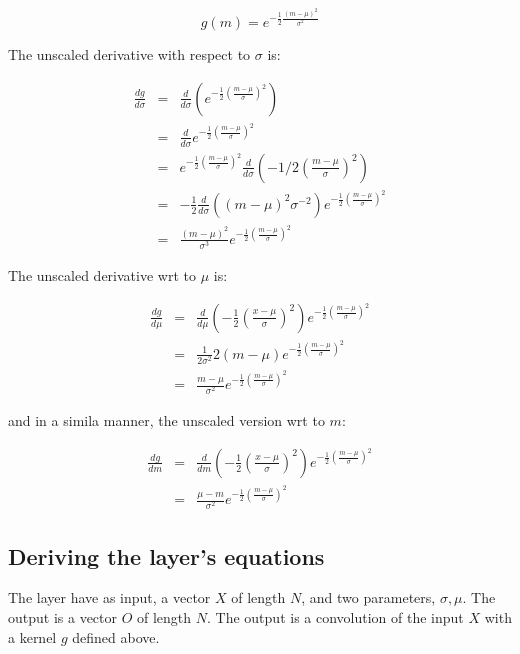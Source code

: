 \documentclass{article}
\begin{document}
\begin{equation}
	g(m) = e^{-\frac{1}{2} \frac{(m - \mu)^2}{\sigma^2}}
\end{equation}


The unscaled derivative with respect to $\sigma$ is:

\begin{eqnarray}
	\frac{d g}{d \sigma}&=&\frac{d}{d \sigma}\left(e^{-\frac{1}{2} \left(\frac{m - \mu}{\sigma}\right)^2} \right) \\
	&=&\frac{d}{d \sigma} e^{-\frac{1}{2} \left(\frac{m - \mu}{\sigma}\right)^2}\\
	&=&e^{-\frac{1}{2} \left(\frac{m - \mu}{\sigma}\right)^2} \frac{d}{d \sigma} \left(-1/2 \left(\frac{m - \mu}{\sigma} \right)^2 \right) \\
	&=&-\frac{1}{2} \frac{d}{d \sigma} \left((m-\mu)^2 \sigma^{-2} \right) e^{-\frac{1}{2} \left(\frac{m - \mu}{\sigma}\right)^2}\\
	&=&\frac{(m-\mu)^2}{\sigma^3}e^{-\frac{1}{2} \left(\frac{m - \mu}{\sigma}\right)^2}
\end{eqnarray}


The unscaled derivative wrt to $\mu$ is:

\begin{eqnarray}
	\frac{d g}{d \mu}&=&\frac{d}{d \mu}\left( -\frac{1}{2} \left(\frac{x-\mu}{\sigma}\right)^2 \right) e^{-\frac{1}{2} \left(\frac{m - \mu}{\sigma}\right)^2} \\
	&=&\frac{1}{2 \sigma ^2} 2 (m-\mu)  e^{-\frac{1}{2} \left(\frac{m - \mu}{\sigma}\right)^2}\\
	&=& \frac{m - \mu}{\sigma ^2} e^{-\frac{1}{2} \left(\frac{m - \mu}{\sigma}\right)^2}
\end{eqnarray}	


and in a simila manner, the unscaled version wrt to $m$:

\begin{eqnarray}
	\frac{d g}{d m}&=&\frac{d}{d m}\left( -\frac{1}{2} \left(\frac{x-\mu}{\sigma}\right)^2 \right) e^{-\frac{1}{2} \left(\frac{m - \mu}{\sigma}\right)^2} \\
	&=& \frac{\mu-m}{\sigma ^2} e^{-\frac{1}{2} \left(\frac{m - \mu}{\sigma}\right)^2}
\end{eqnarray}	


\subsection{Deriving the layer's equations}

The layer have as input, a vector $X$ of length	$N$, and two parameters, $\sigma, \mu$. The output is a vector $O$ of length $N$. The output is a convolution of the input $X$ with a kernel $g$ defined above.\\
\end{document}
